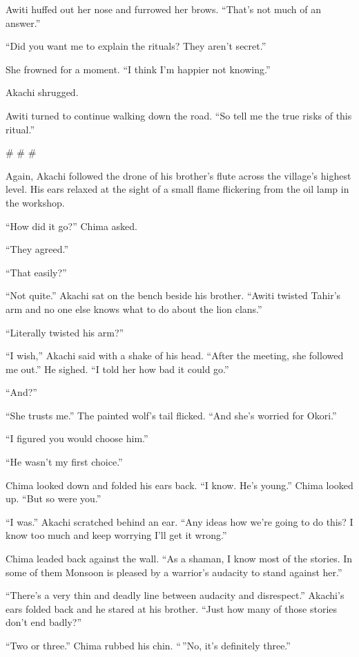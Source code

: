Awiti huffed out her nose and furrowed her brows. ``That's not much of an answer.''

``Did you want me to explain the rituals? They aren't secret.''

She frowned for a moment. ``I think I'm happier not knowing.''

Akachi shrugged.

Awiti turned to continue walking down the road. ``So tell me the true risks of this ritual.''

\# \# \#

Again, Akachi followed the drone of his brother's flute across the village's highest level. His ears relaxed at the sight of a small flame flickering from the oil lamp in the workshop.

``How did it go?'' Chima asked.

``They agreed.''

``That easily?''

``Not quite.'' Akachi sat on the bench beside his brother. ``Awiti twisted Tahir's arm and no one else knows what to do about the lion clans.''

``Literally twisted his arm?''

``I wish,'' Akachi said with a shake of his head. ``After the meeting, she followed me out.'' He sighed. ``I told her how bad it could go.''

``And?''

``She trusts me.'' The painted wolf's tail flicked. ``And she's worried for Okori.''

``I figured you would choose him.''

``He wasn't my first choice.''

Chima looked down and folded his ears back. ``I know. He's young.'' Chima looked up. ``But so were you.''

``I was.'' Akachi scratched behind an ear. ``Any ideas how we're going to do this? I know too much and keep worrying I'll get it wrong.''

Chima leaded back against the wall. ``As a shaman, I know most of the stories. In some of them Monsoon is pleased by a warrior's audacity to stand against her.''

``There's a very thin and deadly line between audacity and disrespect.'' Akachi's ears folded back and he stared at his brother. ``Just how many of those stories don't end badly?''

``Two or three.'' Chima rubbed his chin. ``\,''No, it's definitely three.''

